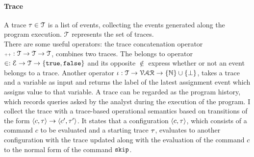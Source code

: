 \paragraph*{Trace}
A trace $\mathtt{\tau} \in \mathcal{T} $ is a list of events, 
collecting the events generated along the program execution. $\mathcal{T} $ represents the set of traces. 
\\
There are some useful operators: the trace concatenation operator ${\scriptscriptstyle ++}: \mathcal{T} \to \mathcal{T} \to \mathcal{T}$, combines two traces.
The belongs to operator $\in : \mathcal{E} \to \mathcal{T} \to \{\mathtt{true}, \mathtt{false} \} $ and its opposite $\not\in$
express whether or not an event belongs to a trace.
Another operator $\iota : \mathcal{T} \to \mathcal{VAR} \to \{\mathbb{N}\}\cup \{\bot\}$,
takes a trace and a variable as input and returns the label of the latest assignment event which assigns value to that variable. 
%
A trace can be regarded as the program history, which records queries asked by the analyst during the execution of the program. I collect the trace with a trace-based operational semantics based on transitions of the form $ \langle c, \mathtt{\tau} \rangle \to \langle c', \mathtt{\tau}' \rangle $. It states that a configuration $\langle c, \mathtt{\tau} \rangle$, which consists of a command $c$ to be evaluated and a starting trace $\mathtt{\tau}$, evaluates to another configuration with the trace updated along with the evaluation of the command $c$ to the normal form of the command $\mathtt{skip}$.

